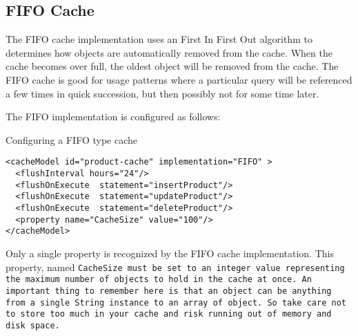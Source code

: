 \subsection{FIFO Cache}
The FIFO cache implementation uses an First In First Out algorithm to
determines how objects are automatically removed from the cache. When the
cache becomes over full, the oldest object will be removed from the cache. The
FIFO cache is good for usage patterns where a particular query will be
referenced a few times in quick succession, but then possibly not for some
time later.

The FIFO implementation is configured as follows:

\begin{example}\label{example:3.49}
Configuring a FIFO type cache
\begin{verbatim}
<cacheModel id="product-cache" implementation="FIFO" >
  <flushInterval hours="24"/>
  <flushOnExecute  statement="insertProduct"/>
  <flushOnExecute  statement="updateProduct"/>
  <flushOnExecute  statement="deleteProduct"/>
  <property name="CacheSize" value="100"/>
</cacheModel>
\end{verbatim}
\end{example}

Only a single property is recognized by the FIFO cache implementation. This
property, named \tt{CacheSize} must be set to an integer value representing
the maximum number of objects to hold in the cache at once. An important thing
to remember here is that an object can be anything from a single String
instance to an array of object. So take care not to store too much in your
cache and risk running out of memory and disk space.
